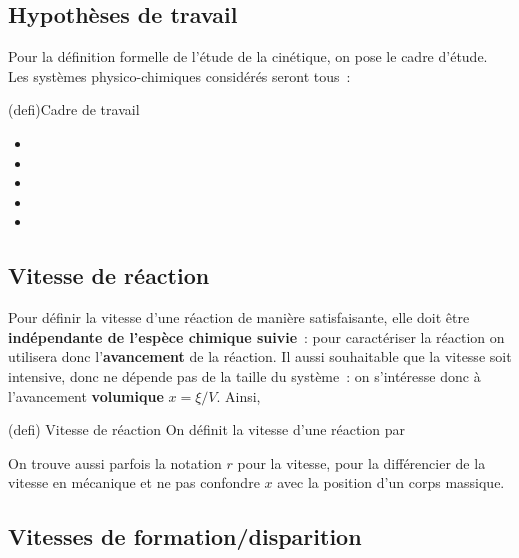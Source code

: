 \documentclass[../../main/main.tex]{subfiles}
\begin{document}
\subsection{Hypothèses de travail}
Pour la définition formelle de l'étude de la cinétique, on pose le cadre
d'étude. Les systèmes physico-chimiques considérés seront tous~:
\begin{tcb}(defi){Cadre de travail}
	\begin{itemize}
		\item {}%
		\item {}%
		\item {}%
		\item {}%
		\item {}%
	\end{itemize}
\end{tcb}

\subsection{Vitesse de réaction}

Pour définir la vitesse d'une réaction de manière satisfaisante, elle doit être
\textbf{indépendante de l'espèce chimique suivie}~: pour caractériser la
réaction on utilisera donc l'\textbf{avancement} de la réaction. Il aussi
souhaitable que la vitesse soit intensive, donc ne dépende pas de la taille du
système~: on s'intéresse donc à l'avancement \textbf{volumique} $x = \xi/V$.
Ainsi,
\begin{tcb*}[label=def:vreac, sidebyside, righthand ratio=.3](defi)
	{Vitesse de réaction}
	On définit la vitesse d'une réaction par
	\psw{%
		\[\boxed{
				v = \dv{x}{t}} \qavec \boxed{x = \frac{\xi}{V}}\]
	}%
	\vspace{-15pt}
	\tcblower
	\psw{%
	\[
		[v] = \si{mol.L^{-1}.s^{-1}}
	\]
	}%
	\vspace{-15pt}
\end{tcb*}

On trouve aussi parfois la notation $r$ pour la vitesse, pour la
différencier de la vitesse en mécanique et ne pas confondre $x$ avec
la position d'un corps massique.

\subsection{Vitesses de formation/disparition}
\end{document}
